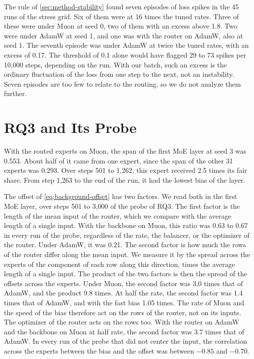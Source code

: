 The rule of \cref{sec:method-stability} found seven episodes of loss spikes in the 45 runs of the stress grid. Six of them were at 16 times the tuned rates. Three of these were under Muon at seed 0, two of them with an excess above 1.8. Two were under AdamW at seed 1, and one was with the router on AdamW, also at seed 1. The seventh episode was under AdamW at twice the tuned rates, with an excess of 0.17. The threshold of 0.1 alone would have flagged 29 to 73 spikes per 10,000 steps, depending on the run. With our batch, such an excess is the ordinary fluctuation of the loss from one step to the next, not an instability. Seven episodes are too few to relate to the routing, so we do not analyze them further.

\section{RQ3 and Its Probe}
\label{app:results-rq3}
With the routed experts on Muon, the span of the first MoE layer at seed 3 was 0.553. About half of it came from one expert, since the span of the other 31 experts was 0.293. Over steps 501 to 1,262, this expert received 2.5 times its fair share. From step 1,263 to the end of the run, it had the lowest bias of the layer.

The offset of \cref{eq:background-offset} has two factors. We read both in the first MoE layer, over steps 501 to 3,000 of the probe of RQ3. The first factor is the length of the mean input of the router, which we compare with the average length of a single input. With the backbone on Muon, this ratio was 0.63 to 0.67 in every run of the probe, regardless of the rate, the balancer, or the optimizer of the router. Under AdamW, it was 0.21. The second factor is how much the rows of the router differ along the mean input. We measure it by the spread across the experts of the component of each row along this direction, times the average length of a single input. The product of the two factors is then the spread of the offsets across the experts. Under Muon, the second factor was 3.0 times that of AdamW, and the product 9.8 times. At half the rate, the second factor was 1.4 times that of AdamW, and with the fast bias 1.05 times. The rate of Muon and the speed of the bias therefore act on the rows of the router, not on its inputs. The optimizer of the router acts on the rows too. With the router on AdamW and the backbone on Muon at half rate, the second factor was 3.7 times that of AdamW\@. In every run of the probe that did not center the input, the correlation across the experts between the bias and the offset was between $-0.85$ and $-0.70$.

